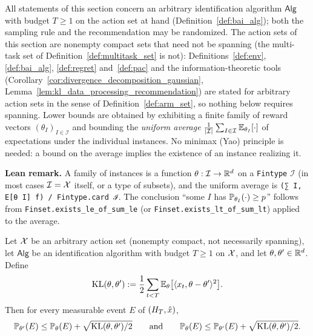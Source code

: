 All statements of this section concern an arbitrary identification algorithm
$\mathsf{Alg}$ with budget $T \ge 1$ on the action set at hand (Definition~\ref{def:bai_alg});
both the sampling rule and the recommendation may be randomized. The action sets of this
section are nonempty compact sets that need not be spanning (the multi-task set of
Definition~\ref{def:multitask_set} is not): Definitions~\ref{def:env}, \ref{def:bai_alg},
\ref{def:regret} and~\ref{def:pac} and the information-theoretic tools
(Corollary~\ref{cor:divergence_decomposition_gaussian},
Lemma~\ref{lem:kl_data_processing_recommendation}) are stated for arbitrary action sets in
the sense of Definition~\ref{def:arm_set}, so nothing below requires spanning. Lower bounds are obtained
by exhibiting a finite family of reward vectors $(\theta_I)_{I\in\mathcal I}$ and bounding the
\emph{uniform average} $\frac{1}{\lvert \mathcal I \rvert}\sum_{I\in\mathcal I}\mathbb{E}_{\theta_I}[\cdot]$ of
expectations under the individual instances. No minimax (Yao) principle is needed: a bound
on the average implies the existence of an instance realizing it.

\textbf{Lean remark.} A family of instances is a function $\theta : \mathcal I \to \mathbb{R}^d$ on a
\texttt{Fintype} $\mathcal I$ (in most cases $\mathcal I = \mathcal{X}$ itself, or a type of
subsets), and the uniform average is
\texttt{(∑ I, E[θ I] f) / Fintype.card ℐ}. The conclusion ``some $I$ has
$\mathbb{P}_{\theta_I}(\cdot) \ge p$'' follows from \texttt{Finset.exists\_le\_of\_sum\_le}
(or \texttt{Finset.exists\_lt\_of\_sum\_lt}) applied to the average.

\begin{lemma}\label{lem:two_point_pinsker}
\leanok
{}
Let $\mathcal{X}$ be an arbitrary action set (nonempty compact, not necessarily spanning), let
$\mathsf{Alg}$ be an identification algorithm with budget $T \ge 1$ on $\mathcal{X}$, and
let $\theta, \theta' \in \mathbb{R}^d$. Define
\[
  \mathrm{KL}(\theta,\theta') := \frac12\sum_{t<T}\mathbb{E}_\theta\big[\langle x_t, \theta - \theta' \rangle^2\big].
\]
Then for every measurable event $E$ of $(H_T, \hat{x})$,
\[
  \mathbb{P}_{\theta'}(E) \le \mathbb{P}_\theta(E) + \sqrt{\mathrm{KL}(\theta,\theta')/2}
  \qquad\text{and}\qquad
  \mathbb{P}_{\theta}(E) \le \mathbb{P}_{\theta'}(E) + \sqrt{\mathrm{KL}(\theta,\theta')/2}.
\]
\end{lemma}

